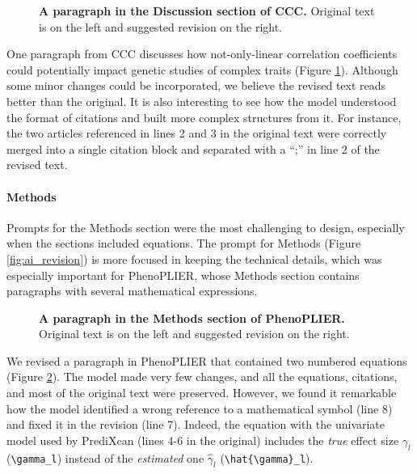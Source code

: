 \documentclass[
]{article}
\begin{document}
\begin{figure}
\hypertarget{fig:discussion:ccc}{%
\centering

\caption{\textbf{A paragraph in the Discussion section of CCC.}
Original text is on the left and suggested revision on the right.}\label{fig:discussion:ccc}
}
\end{figure}

One paragraph from CCC discusses how not-only-linear correlation coefficients could potentially impact genetic studies of complex traits (Figure \ref{fig:discussion:ccc}).
Although some minor changes could be incorporated, we believe the revised text reads better than the original.
It is also interesting to see how the model understood the format of citations and built more complex structures from it.
For instance, the two articles referenced in lines 2 and 3 in the original text were correctly merged into a single citation block and separated with a ``;'' in line 2 of the revised text.

\paragraph{Methods}

Prompts for the Methods section were the most challenging to design, especially when the sections included equations.
The prompt for Methods (Figure \ref{fig:ai_revision}) is more focused in keeping the technical details, which was especially important for PhenoPLIER, whose Methods section contains paragraphs with several mathematical expressions.

\begin{figure}
\hypertarget{fig:methods:phenoplier}{%
\centering

\caption{\textbf{A paragraph in the Methods section of PhenoPLIER.}
Original text is on the left and suggested revision on the right.}\label{fig:methods:phenoplier}
}
\end{figure}

We revised a paragraph in PhenoPLIER that contained two numbered equations (Figure \ref{fig:methods:phenoplier}).
The model made very few changes, and all the equations, citations, and most of the original text were preserved.
However, we found it remarkable how the model identified a wrong reference to a mathematical symbol (line 8) and fixed it in the revision (line 7).
Indeed, the equation with the univariate model used by PrediXcan (lines 4-6 in the original) includes the \emph{true} effect size \(\gamma_l\) (\texttt{\textbackslash{}gamma\_l}) instead of the \emph{estimated} one \(\hat{\gamma}_l\) (\texttt{\textbackslash{}hat\{\textbackslash{}gamma\}\_l}).
\end{document}
